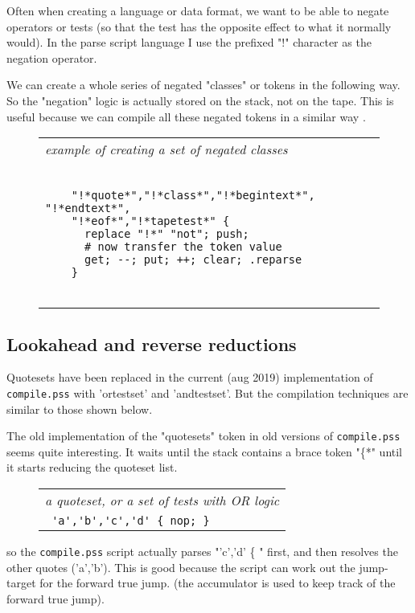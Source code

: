 \documentclass[a4paper,12pt]{article}
\begin{document}
  Often when creating a language or data format, we want to
  be able to negate operators or tests (so that the test has
  the opposite effect to what it normally would). In the parse
  script language I use the prefixed "!" character as the
  negation operator.

  We can create a whole series of negated "classes" or tokens in
  the following way. So the "negation" logic is actually stored
  on the stack, not on the tape. This is useful because we can
  compile all these negated tokens in a similar way .
 \begin{figure}
 \begin{tabular}{ l }
 \emph{ example of creating a set of negated classes } \\ 
 \begin{lstlisting}[breaklines] 

    "!*quote*","!*class*","!*begintext*", "!*endtext*",
    "!*eof*","!*tapetest*" {
      replace "!*" "not"; push;
      # now transfer the token value
      get; --; put; ++; clear; .reparse
    }
  
 \end{lstlisting} 
 \end{tabular} 

 \end{figure}

\subsection{Lookahead and reverse reductions}

  Quotesets have been replaced in the current (aug 2019) implementation
  of \texttt{compile.pss} with 'ortestset' and 'andtestset'. But the compilation
  techniques are similar to those shown below.

  The old implementation of the "quotesets" token in old versions of
  \texttt{compile.pss} seems quite interesting. It waits until the stack contains a
  brace token "\{*" until it starts reducing the quoteset list.
 \begin{figure}
 \begin{tabular}{ l }
 \emph{ a quoteset, or a set of tests with OR logic } \\ 
 \verb| 'a','b','c','d' { nop; } |
 \end{tabular} 
 \end{figure}

  so the \texttt{compile.pss} script actually parses "'c','d' \{ " first, and
  then resolves the other quotes ('a','b'). This is good because
  the script can work out the jump-target for the forward true jump.
  (the accumulator is used to keep track of the forward true jump).
\end{document}
